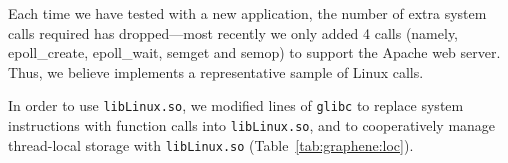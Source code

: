 Each time we have tested \sysname{} with a new application, the number of extra system calls
required has dropped---most recently we only added 4 calls
(namely, epoll\_create, epoll\_wait, semget and semop)
to support the Apache web server.
Thus, we believe \sysname{} implements a representative sample of Linux calls.



\begin{comment}
Most {\tt libLinux.so} code reimplements
Linux kernel functionality.  We found it expedient to 
read the Linux source in order to understand its behavior and then reimplement 
that behavior on the \pal{} ABI in most cases.
In some cases, such as the file caching code,
we refactored code directly from the Linux kernel.
\end{comment}

In order to use {\tt libLinux.so}, we modified \libclines{} lines of {\tt glibc} to replace 
system instructions with function calls into {\tt lib\-Linux.so},
and to cooperatively manage thread-local storage with {\tt libLinux.so} (Table~\ref{tab:graphene:loc}).




\begin{comment}
\vspace{5pt}
\noindent{\bf ABI Extensions.~}
\sysname{} extends the Drawbridge ABI with 9 additional \pal{} calls.
As discussed above, one creates a new sandbox, and 
5 additional calls were added for IPC.
We also add 3 calls to manage x86 segmentation registers
and exceptions (Bascule~\citep{baumann13bascule} adds
similar extensions).
\end{comment}

